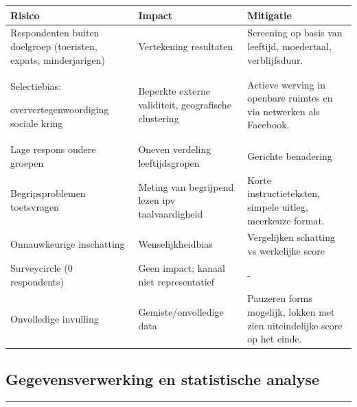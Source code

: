 \documentclass[
]{article}
\newcounter{none} %
\begin{document}
{\def\LTcaptype{none} %
\begin{longtable}[]{@{}
  >{\raggedright\arraybackslash}p{}
  >{\raggedright\arraybackslash}p{}
  >{\raggedright\arraybackslash}p{}@{}}
\toprule\noalign{}
\begin{minipage}[b]{\linewidth}\raggedright
Risico
\end{minipage} & \begin{minipage}[b]{\linewidth}\raggedright
Impact
\end{minipage} & \begin{minipage}[b]{\linewidth}\raggedright
Mitigatie
\end{minipage} \\
\midrule\noalign{}
\endhead
\bottomrule\noalign{}
\endlastfoot
Respondenten buiten doelgroep (toeristen, expats, minderjarigen) &
Vertekening resultaten & Screening op basis van leeftijd, moedertaal,
verblijfsduur. \\
Selectiebias:

oververtegenwoordiging sociale kring & Beperkte externe validiteit,
geografische clustering & Actieve werving in openbare ruimtes en via
netwerken als Facebook. \\
Lage respons oudere groepen & Oneven verdeling leeftijdsgropen &
Gerichte benadering \\
Begripsproblemen toetsvragen & Meting van begrijpend lezen ipv
taalvaardigheid & Korte instructieteksten, simpele uitleg, meerkeuze
format. \\
Onnauwkeurige inschatting & Wenselijkheidbias & Vergelijken schatting vs
werkelijke score \\
Surveycircle (0 respondents) & Geen impact; kanaal niet representatief &
- \\
Onvolledige invulling & Gemiste/onvolledige data & Pauzeren forms
mogelijk, lokken met zien uiteindelijke score op het einde. \\
\end{longtable}
}

\subsection{Gegevensverwerking en statistische
analyse}\label{gegevensverwerking-en-statistische-analyse}

\begin{center}\rule{0.5\linewidth}{0.5pt}\end{center}
\end{document}
